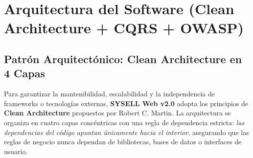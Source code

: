 \chapter{Arquitectura del Software (Clean Architecture + CQRS + OWASP)}

\section{Patrón Arquitectónico: Clean Architecture en 4 Capas}
Para garantizar la mantenibilidad, escalabilidad y la independencia de frameworks o tecnologías externas, \textbf{SYSELL Web v2.0} adopta los principios de \textbf{Clean Architecture} propuestos por Robert C. Martin. La arquitectura se organiza en cuatro capas concéntricas con una regla de dependencia estricta: \textit{las dependencias del código apuntan únicamente hacia el interior}, asegurando que las reglas de negocio nunca dependan de bibliotecas, bases de datos o interfaces de usuario.

